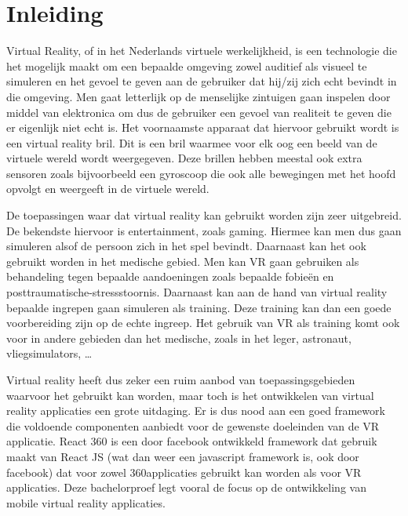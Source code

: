 
\chapter{Inleiding}
\label{ch:inleiding}
Virtual Reality, of in het Nederlands virtuele werkelijkheid, is een technologie die het mogelijk maakt om een bepaalde omgeving zowel auditief als visueel te simuleren en het gevoel te geven aan de gebruiker dat hij/zij zich echt bevindt in die omgeving. Men gaat letterlijk op de menselijke zintuigen gaan inspelen door middel van elektronica om dus de gebruiker een gevoel van realiteit te geven die er eigenlijk niet echt is. Het voornaamste apparaat dat hiervoor gebruikt wordt is een virtual reality bril. Dit is een bril waarmee voor elk oog een beeld van de virtuele wereld wordt weergegeven. Deze brillen hebben meestal ook extra sensoren zoals bijvoorbeeld een gyroscoop die ook alle bewegingen met het hoofd opvolgt en weergeeft in de virtuele wereld.

De toepassingen waar dat virtual reality kan gebruikt worden zijn zeer uitgebreid. De bekendste hiervoor is entertainment, zoals gaming. Hiermee kan men dus gaan simuleren alsof de persoon zich in het spel bevindt. Daarnaast kan het ook gebruikt worden in het medische gebied. Men kan VR gaan gebruiken als behandeling tegen bepaalde aandoeningen zoals bepaalde fobieën en posttraumatische-stressstoornis. Daarnaast kan aan de hand van virtual reality bepaalde ingrepen gaan simuleren als training. Deze training kan dan een goede voorbereiding zijn op de echte ingreep. Het gebruik van VR als training komt ook voor in andere gebieden dan het medische, zoals in het leger, astronaut, vliegsimulators, …

Virtual reality heeft dus zeker een ruim aanbod van toepassingsgebieden waarvoor het gebruikt kan worden, maar toch is het ontwikkelen van virtual reality applicaties een grote uitdaging. Er is dus nood aan een goed framework die voldoende componenten aanbiedt voor de gewenste doeleinden van de VR applicatie. React 360 is een door facebook ontwikkeld framework dat gebruik maakt van React JS (wat dan weer een javascript framework is, ook door facebook) dat voor zowel 360\textdegree applicaties gebruikt kan worden als voor VR applicaties. Deze bachelorproef legt vooral de focus op de ontwikkeling van mobile virtual reality applicaties.

